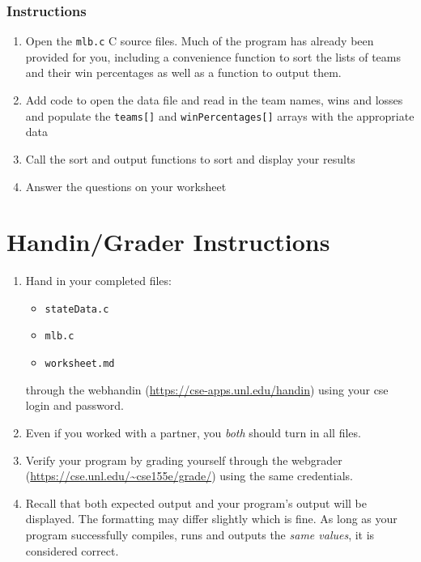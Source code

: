 \documentclass[12pt]{scrartcl}
\begin{document}
\subsubsection*{Instructions}

\begin{enumerate}
  \item Open the \texttt{mlb.c} C source files.  Much of the program 
  	has already been provided for you, including a convenience function to 
	sort the lists of teams and their win percentages as well as a function 
	to output them.
  \item Add code to open the data file and read in the team names, wins and 
	losses and populate the \texttt{teams[]} and \texttt{winPercentages[]} 
	arrays with the appropriate data
  \item Call the sort and output functions to sort and display your results
  \item Answer the questions on your worksheet
\end{enumerate}

\section{Handin/Grader Instructions}

\begin{enumerate}
  \item Hand in your completed files:
  \begin{itemize}
    \item \texttt{stateData.c}
    \item \texttt{mlb.c}
    \item \texttt{worksheet.md}
  \end{itemize}
  through the webhandin (\url{https://cse-apps.unl.edu/handin}) 
  using your cse login and password.  
  \item Even if you worked with a partner, you \emph{both} should
  turn in all files.
  \item Verify your program by grading yourself through the
  webgrader (\url{https://cse.unl.edu/~cse155e/grade/}) using the
  same credentials.
  \item Recall that both expected output and your program's output
  will be displayed.  The formatting may differ slightly which is fine.
  As long as your program successfully compiles, runs and outputs 
  the \emph{same values}, it is considered correct.
\end{enumerate}
\end{document}
